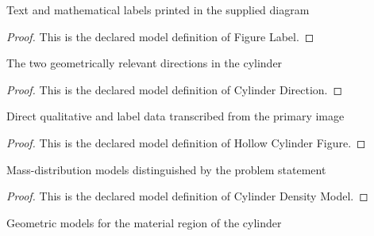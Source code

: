 \begin{definition}
  \label{def:physics:phyx-mini-0822:phyxminiproblems-problemphyxmini0822-figurelabel}
  Text and mathematical labels printed in the supplied diagram
\end{definition}
\begin{proof}
  This is the declared model definition of Figure Label.
\end{proof}
\begin{definition}
  \label{def:physics:phyx-mini-0822:phyxminiproblems-problemphyxmini0822-cylinderdirection}
  The two geometrically relevant directions in the cylinder
\end{definition}
\begin{proof}
  This is the declared model definition of Cylinder Direction.
\end{proof}
\begin{definition}
  \label{def:physics:phyx-mini-0822:phyxminiproblems-problemphyxmini0822-hollowcylinderfigure}
  Direct qualitative and label data transcribed from the primary image
\end{definition}
\begin{proof}
  This is the declared model definition of Hollow Cylinder Figure.
\end{proof}
\begin{definition}
  \label{def:physics:phyx-mini-0822:phyxminiproblems-problemphyxmini0822-cylinderdensitymodel}
  Mass-distribution models distinguished by the problem statement
\end{definition}
\begin{proof}
  This is the declared model definition of Cylinder Density Model.
\end{proof}
\begin{definition}
  \label{def:physics:phyx-mini-0822:phyxminiproblems-problemphyxmini0822-cylindergeometry}
  Geometric models for the material region of the cylinder
\end{definition}
